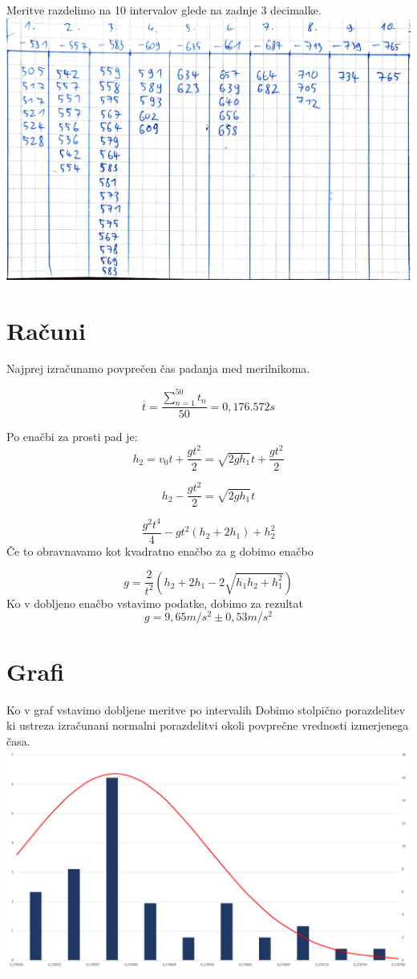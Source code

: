 \documentclass[a4paper]{report}
\begin{document}
Meritve razdelimo na 10 intervalov glede na zadnje 3 decimalke.\\
\includegraphics[width=\textwidth]{Tabela intervalov}

\chapter*{Računi}
Najprej izračunamo povprečen čas padanja med merilnikoma.

\[\overline{t}=\frac{\sum_{n=1}^{50}t_n}{50}=0,176.572s\]

Po enačbi za prosti pad je:
 \[h_2=v_0t+\frac{gt^2}{2}=\sqrt{2gh_1}t+\frac{gt^2}{2}\]
 
 \[h_2-\frac{gt^2}{2}=\sqrt{2gh_1}t\]
 
 \[\frac{g^2t^4}{4}-gt^2(h_2+2h_1)+h_2^2\]
 Če to obravnavamo kot kvadratno enačbo za g dobimo enačbo
 
 \[g=\frac{2}{t^2}\left(h_2+2h_1-2\sqrt{h_1h_2+h_1^2}\right)\]
 Ko v dobljeno enačbo vstavimo podatke, dobimo za rezultat 
 \[g=9,65m/s^2\pm 0,53m/s^2\]
 
\chapter*{Grafi}
Ko v graf vstavimo dobljene meritve po intervalih Dobimo stolpično porazdelitev ki ustreza izračunani normalni porazdelitvi okoli povprečne vrednosti izmerjenega časa.\\
 
\includegraphics[width=\textwidth]{Normalna porazdelitev}
 
\end{document}
